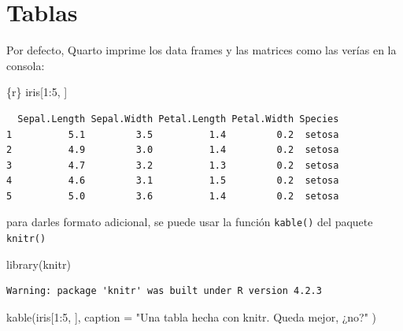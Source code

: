 \documentclass[
  letterpaper,
  DIV=11,
  numbers=noendperiod]{scrreprt}
\newenvironment{Shaded}{\begin{snugshade}}{\end{snugshade}}
\newcommand{\AttributeTok}[1]{\textcolor[rgb]{0.40,0.45,0.13}{#1}}
\newcommand{\DecValTok}[1]{\textcolor[rgb]{0.68,0.00,0.00}{#1}}
\newcommand{\FunctionTok}[1]{\textcolor[rgb]{0.28,0.35,0.67}{#1}}
\newcommand{\InformationTok}[1]{\textcolor[rgb]{0.37,0.37,0.37}{#1}}
\newcommand{\NormalTok}[1]{\textcolor[rgb]{0.00,0.23,0.31}{#1}}
\newcommand{\SpecialCharTok}[1]{\textcolor[rgb]{0.37,0.37,0.37}{#1}}
\newcommand{\StringTok}[1]{\textcolor[rgb]{0.13,0.47,0.30}{#1}}
\begin{document}
\hypertarget{tablas}{%
\section{Tablas}\label{tablas}}

Por defecto, Quarto imprime los data frames y las matrices como las
verías en la consola:

\begin{Shaded}
\begin{Highlighting}[]
\InformationTok{\textasciigrave{}\textasciigrave{}\textasciigrave{}\{r\}}
\NormalTok{iris[}\DecValTok{1}\SpecialCharTok{:}\DecValTok{5}\NormalTok{, ]}
\InformationTok{\textasciigrave{}\textasciigrave{}\textasciigrave{}}
\end{Highlighting}
\end{Shaded}

\begin{verbatim}
  Sepal.Length Sepal.Width Petal.Length Petal.Width Species
1          5.1         3.5          1.4         0.2  setosa
2          4.9         3.0          1.4         0.2  setosa
3          4.7         3.2          1.3         0.2  setosa
4          4.6         3.1          1.5         0.2  setosa
5          5.0         3.6          1.4         0.2  setosa
\end{verbatim}

para darles formato adicional, se puede usar la función \texttt{kable()}
del paquete \texttt{knitr()}

\begin{Shaded}
\begin{Highlighting}[]
\FunctionTok{library}\NormalTok{(knitr)}
\end{Highlighting}
\end{Shaded}

\begin{verbatim}
Warning: package 'knitr' was built under R version 4.2.3
\end{verbatim}

\begin{Shaded}
\begin{Highlighting}[]
\FunctionTok{kable}\NormalTok{(iris[}\DecValTok{1}\SpecialCharTok{:}\DecValTok{5}\NormalTok{, ], }
      \AttributeTok{caption =} \StringTok{"Una tabla hecha con knitr. Queda mejor, ¿no?"}
\NormalTok{)}
\end{Highlighting}
\end{Shaded}
\end{document}

